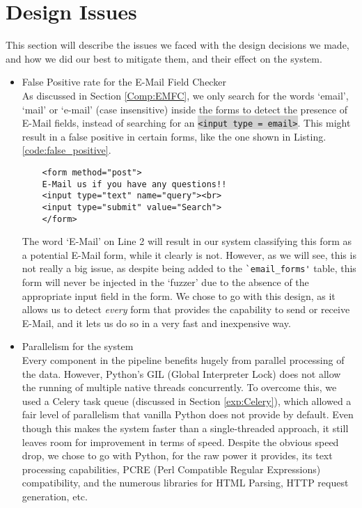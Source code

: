 \section[Issues]{Design Issues}

This section will describe the issues we faced with the design decisions we made, and how we did our best to mitigate them, and their effect on the system.

\begin{itemize}
	\item \label{issues:fpr}False Positive rate for the E-Mail Field Checker\\
	As discussed in Section \ref{Comp:EMFC}, we only search for the words `email', `mail' or `e-mail' (case insensitive) inside the forms to detect the presence of E-Mail fields, instead of searching for an \colorbox{lightgray}{\lstinline{<input type = email>}}. This might result in a false positive in certain forms, like the one shown in Listing. \ref{code:false_positive}.
	
	\begin{lstlisting}
	<form method="post">
	E-Mail us if you have any questions!!
	<input type="text" name="query"><br>
	<input type="submit" value="Search">
	</form>
	\end{lstlisting}
	
	The word `E-Mail' on Line 2 will result in our system classifying this form as a potential E-Mail form, while it clearly is not. However, as we will see, this is not really a big issue, as despite being added to the \lstinline{`email_forms'} table, this form will never be injected in the `fuzzer' due to the absence of the appropriate input field in the form. We chose to go with this design, as it allows us to detect \emph{every} form that provides the capability to send or receive E-Mail, and it lets us do so in a very fast and inexpensive way.
	
	
	\item Parallelism for the system\\
	Every component in the pipeline benefits hugely from parallel processing of the data. However, Python's GIL (Global Interpreter Lock) does not allow the running of multiple native threads concurrently. To overcome this, we used a Celery task queue (discussed in Section \ref{exp:Celery}), which allowed a fair level of parallelism that vanilla Python does not provide by default. Even though this makes the system faster than a single-threaded approach, it still leaves room for improvement in terms of speed. Despite the obvious speed drop, we chose to go with Python, for the raw power it provides, its text processing capabilities, PCRE (Perl Compatible Regular Expressions) compatibility, and the numerous libraries for HTML Parsing, HTTP request generation, etc.
	

\end{itemize}

